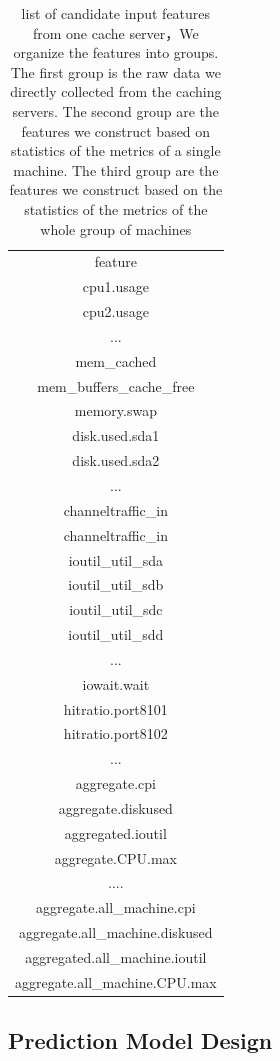 \documentclass[5p]{elsarticle}
\begin{document}
\begin{table}[]
\centering
\begin{tabular}{|c|}
\hline  
feature\\
cpu1.usage\\
cpu2.usage\\
...  \\
mem\_cached\\
mem\_buffers\_cache\_free\\
memory.swap\\ 
disk.used.sda1\\
disk.used.sda2\\
...\\
channeltraffic\_in\\
channeltraffic\_in\\
ioutil\_util\_sda\\
ioutil\_util\_sdb\\
ioutil\_util\_sdc\\
ioutil\_util\_sdd\\
...\\
iowait.wait\\
hitratio.port8101\\
hitratio.port8102\\
...\\
\hline 
aggregate.cpi\\
aggregate.diskused\\
aggregated.ioutil\\
aggregate.CPU.max\\
....\\
\hline 
aggregate.all\_machine.cpi\\
aggregate.all\_machine.diskused\\
aggregated.all\_machine.ioutil\\
aggregate.all\_machine.CPU.max\\
\hline 
\end{tabular}
\caption{list of candidate input features from one cache server，We organize the features into groups. The first group is the raw data we directly collected from the caching servers. The second group are the features we construct based on statistics of the metrics of a single machine. The third group are the features we construct based on the statistics of the metrics of the whole group of machines}
\label{my-label}
\end{table}



\subsection{Prediction Model Design}
\end{document}
